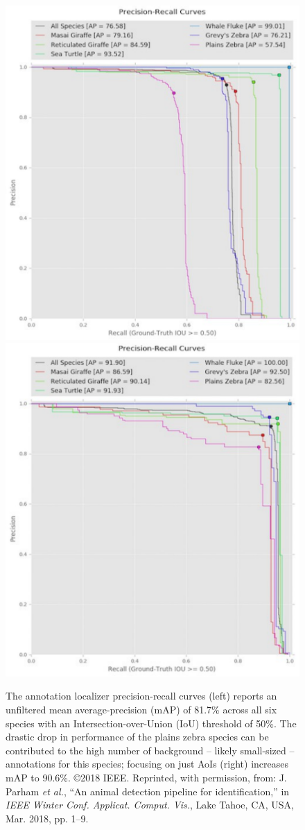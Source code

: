 \begin{figure}[!t]
    \begin{center}
        \includegraphics[width=0.48\linewidth]{resources/localizer-pr-all-a.pdf}
        \hspace{1mm}
        \includegraphics[width=0.48\linewidth]{resources/localizer-pr-all-b.pdf}
    \end{center}
    \caption{The annotation localizer precision-recall curves (left) reports an unfiltered mean average-precision (mAP) of 81.7\% across all six species with an Intersection-over-Union (IoU) threshold of 50\%.  The drastic drop in performance of the plains zebra species can be contributed to the high number of background  -- likely small-sized -- annotations for this species; focusing on just AoIs (right) increases mAP to 90.6\%.  \copyright 2018 IEEE. Reprinted, with permission, from: J. Parham \textit{et al.}, ``An animal detection pipeline for identification,'' in \textit{IEEE Winter Conf. Applicat. Comput. Vis.}, Lake Tahoe, CA, USA, Mar. 2018, pp. 1–9.}
    \label{fig:performance-localizer}
\end{figure}

